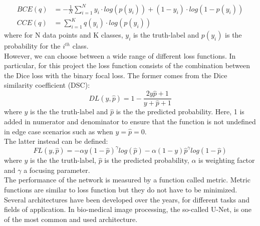 \documentclass{standalone}
\begin{document}
\begin{align}
    BCE(q) &= - \frac{1}{N} \sum_{i = 1}^{N} y_i \cdot log(p(y_i)) + (1 - y_i) \cdot log(1 - p(y_i)) \\ 
    CCE(q) &=  \sum_{i = 1}^{K} q(y_i) \cdot log(p(y_i))
\end{align}
where for N data points and K classes, $y_i$ is the truth-label and $p(y_i)$ is the probability for the $i^{th}$ class.
\\
However, we can choose between a wide range of different loss functions\cite{camborata}.
In particular, for this project the loss function consists of the combination between the Dice loss with the binary focal loss\cite{focal}.
The former comes from the Dice similarity coefficient (DSC):
\begin{equation}
    DL(y, \hat{p}) = 1 - \frac{2y\hat{p} + 1}{y + \hat{p} + 1}
\end{equation}
where $y$ is the the truth-label and $\hat{p}$ is the the predicted probability.
Here, 1 is added in numerator and denominator to ensure that the function is not undefined in edge case scenarios such as when $y = \hat{p} = 0$.
\\
The latter instead can be defined: 
\begin{equation}
    FL(y, \hat{p}) = - \alpha y(1 - \hat{p})^{\gamma}log(\hat{p}) - \alpha (1 - y) \hat{p}^{\gamma}log(1 - \hat{p})
\end{equation}
where $y$ is the the truth-label, $\hat{p}$ is the predicted probability, $\alpha$ is weighting factor and $\gamma$ a focusing parameter.
\\
The performance of the network is measured by a function called metric.
Metric functions are similar to loss function but they do not have to be minimized.
\\
Several architectures have been developed over the years, for different tasks and fields of application.
In bio-medical image processing, the so-called U-Net, is one of the most common and used architecture\cite{unet}.
\end{document}
